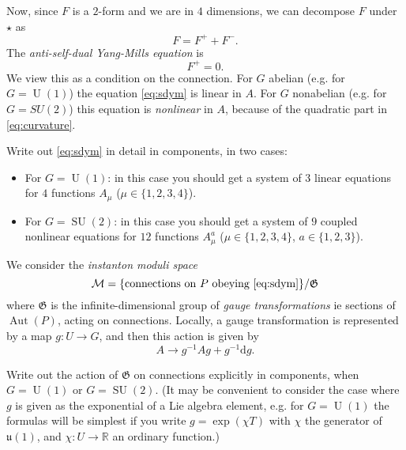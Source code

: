 \documentclass[12pt,letterpaper,reqno]{article}
\numberwithin{equation}{section}
\newcommand{\fG}{{\mathfrak G}}
\newcommand{\cM}{\ensuremath{\mathcal M}}
\newcommand{\R}{\ensuremath{\mathbb R}}
\newcommand{\de}{\mathrm{d}}
\newcommand{\ti}[1]{\textit{#1}}
\DeclareMathOperator{\Aut}{Aut}
\DeclareMathOperator{\SU}{SU}
\DeclareMathOperator{\U}{U}
\begin{document}
Now, since $F$ is a $2$-form and we are in $4$ dimensions,
we can decompose $F$ under $\star$ as
\begin{equation}
  F = F^+ + F^-.
\end{equation}
The \ti{anti-self-dual Yang-Mills equation} is
\begin{equation} \label{eq:sdym}
  F^+ = 0.
\end{equation}
We view this as a condition on the connection.
For $G$ abelian (e.g. for $G = \U(1)$) the equation \eqref{eq:sdym} is linear in $A$.
For $G$ nonabelian (e.g. for $G = SU(2)$) this
equation is \ti{nonlinear} in $A$, because of the quadratic part in \eqref{eq:curvature}.

\begin{exercise} Write out \eqref{eq:sdym} in detail in components, in two cases:
\begin{itemize}
  \item For $G = \U(1)$: in this case you should get a system of $3$ linear equations for $4$ functions $A_\mu$
  ($\mu \in \{1,2,3,4\}$).
  \item For $G = \SU(2)$: in this case you should get a system of $9$ coupled nonlinear equations for
  $12$ functions $A^a_\mu$ ($\mu \in \{1,2,3,4\}$, $a \in \{1,2,3\}$).
\end{itemize}
\end{exercise}

We consider the \ti{instanton moduli space}
\begin{equation}
  \cM = \{ \text{connections on $P$ obeying \eqref{eq:sdym}} \} / \fG
\end{equation}
where $\fG$ is the infinite-dimensional group of \ti{gauge transformations} ie
sections of $\Aut(P)$, acting on connections. Locally, a gauge transformation
is represented by a map $g: U \to G$, and then
this action is given by
\begin{equation}
  A \to g^{-1} A g + g^{-1} \de g.
\end{equation}

\begin{exercise}
Write out the action of $\fG$ on connections
explicitly in components, when $G = \U(1)$ or $G = \SU(2)$.
(It may be convenient to consider the case where $g$ is given as
the exponential of a Lie algebra element, e.g. for $G = \U(1)$
the formulas will be simplest if you write $g = \exp(\chi T)$ with $\chi$
the generator of ${\mathfrak u}(1)$, and $\chi: U \to \R$ an ordinary function.)
\end{exercise}
\end{document}
